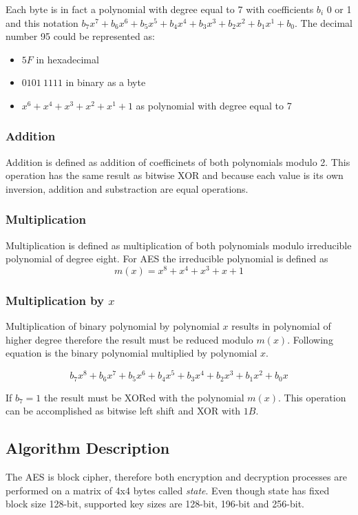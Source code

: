 Each byte is in fact a polynomial with degree equal to 7 with coefficients
$b_i$ 0 or 1 and this notation $b_7x^7 + b_6x^6 + b_5x^5 + b_4x^4 + b_3x^3
+ b_2x^2 + b_1x^1 + b_0$. The decimal number 95 could be represented as:
\begin{itemize}
\item $5F$ in hexadecimal
\item $0101~1111$ in binary as a byte
\item $x^6 + x^4 + x^3 + x^2 + x^1 + 1$ as polynomial with degree equal to 7
\end{itemize}

\subsubsection*{Addition}
Addition is defined as addition of coefficinets of both polynomials modulo
2. This operation has the same result as bitwise XOR and because 
each value is its own inversion, addition and substraction are equal
operations.

\subsubsection*{Multiplication}
Multiplication is defined as multiplication of both polynomials modulo
irreducible polynomial of degree eight. For AES the irreducible polynomial
is defined as
\begin{equation}
m(x) = x^8 + x^4 + x^3 + x + 1
\end{equation}

\subsubsection*{Multiplication by $x$}
Multiplication of binary polynomial by polynomial $x$ results in polynomial of
higher degree therefore the result must be reduced modulo $m(x)$. Following
equation is the binary polynomial multiplied by polynomial $x$.

\begin{equation}
b_7x^8+b_6x^7+b_5x^6+b_4x^5+b_3x^4+b_2x^3+b_1x^2+b_0x
\end{equation} 

If $b_7 = 1$ the result must be XORed with the polynomial $m(x)$. This operation
can be accomplished as bitwise left shift and XOR with $1B$.

\subsection{Algorithm Description}
The AES is block cipher, therefore both encryption and decryption processes
are performed on a matrix of 4x4 bytes called \textit{state}. Even though
state has fixed block size 128-bit, supported key sizes are 128-bit, 196-bit
and 256-bit. 

